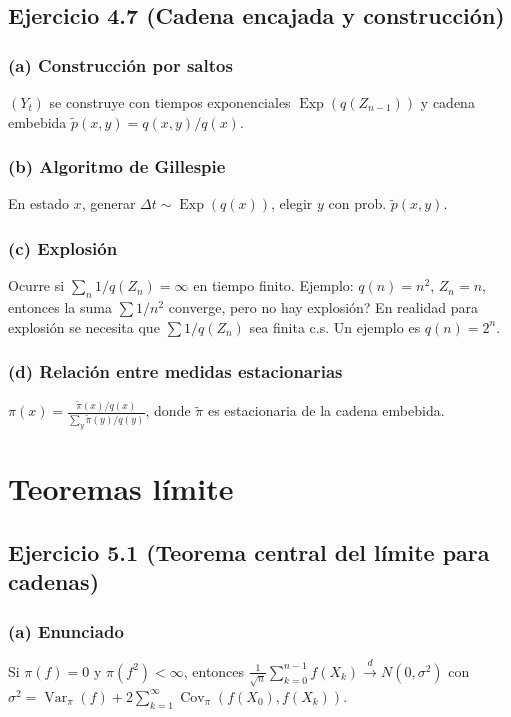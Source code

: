 \documentclass[12pt]{article}
\newcommand{\1}{\mathbf{1}}
\newcommand{\Var}{\operatorname{Var}}
\newcommand{\Cov}{\operatorname{Cov}}
\newcommand{\Exp}{\operatorname{Exp}}
\begin{document}
\subsection{Ejercicio 4.7 (Cadena encajada y construcci\'on)}

\subsubsection*{(a) Construcci\'on por saltos}
$(Y_t)$ se construye con tiempos exponenciales $\Exp(q(Z_{n-1}))$ y cadena embebida $\tilde p(x,y)=q(x,y)/q(x)$.

\subsubsection*{(b) Algoritmo de Gillespie}
En estado $x$, generar $\Delta t\sim\Exp(q(x))$, elegir $y$ con prob. $\tilde p(x,y)$.

\subsubsection*{(c) Explosi\'on}
Ocurre si $\sum_n 1/q(Z_n)=\infty$ en tiempo finito. Ejemplo: $q(n)=n^2$, $Z_n=n$, entonces la suma $\sum 1/n^2$ converge, pero no hay explosi\'on? En realidad para explosi\'on se necesita que $\sum 1/q(Z_n)$ sea finita c.s. Un ejemplo es $q(n)=2^n$.

\subsubsection*{(d) Relaci\'on entre medidas estacionarias}
$\pi(x)=\frac{\tilde\pi(x)/q(x)}{\sum_y\tilde\pi(y)/q(y)}$, donde $\tilde\pi$ es estacionaria de la cadena embebida.

\section{Teoremas l\'imite}

\subsection{Ejercicio 5.1 (Teorema central del l\'imite para cadenas)}

\subsubsection*{(a) Enunciado}
Si $\pi(f)=0$ y $\pi(f^2)<\infty$, entonces $\frac1{\sqrt{n}}\sum_{k=0}^{n-1}f(X_k)\xrightarrow{d}N(0,\sigma^2)$ con $\sigma^2=\Var_\pi(f)+2\sum_{k=1}^\infty\Cov_\pi(f(X_0),f(X_k))$.
\end{document}
